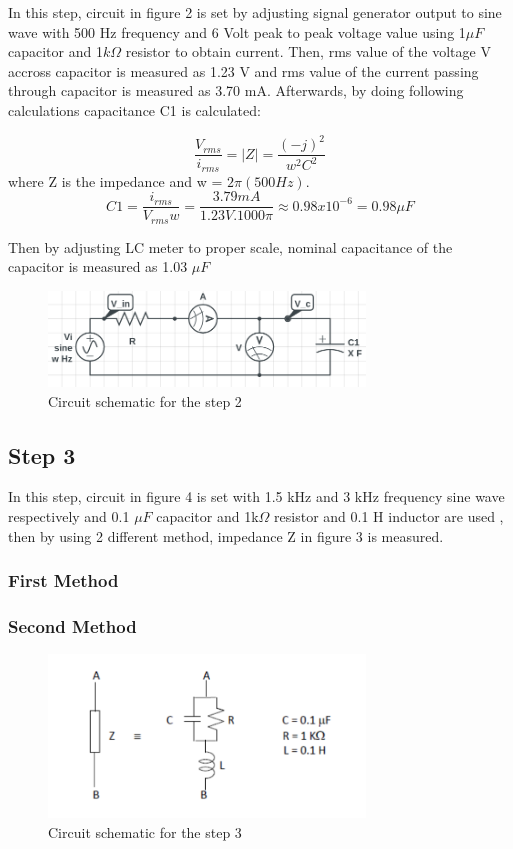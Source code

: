 \documentclass[letterpaper,12pt]{article}
\begin{document}
In this step, circuit in figure 2 is set by adjusting signal generator output to sine wave with 500 Hz frequency and 6 Volt peak to peak voltage value using 1\(\mu F\) capacitor and 1\(k\Omega \) resistor to obtain current. Then, rms value of the voltage V accross capacitor is measured as 1.23 V and rms value of the current passing through capacitor is measured as 3.70 mA. Afterwards, by doing following calculations capacitance C1 is calculated:

\[\frac{V_{rms}}{i_{rms}} = |Z| = \frac{(-j)^2}{w^2C^2}\]
where Z is the impedance and w = \(2\pi (500 Hz)\).  
\[C1 = \frac{i_{rms}}{V_{rms}w}  =  \frac{3.79 mA}{1.23 V . 1000\pi} \approx 0.98x10^{-6} = 0.98 \mu F\]

Then by adjusting LC meter to proper scale, nominal capacitance of the capacitor is measured as 1.03 \(\mu F\)
\begin{figure}[H]
    \centering
    \includegraphics[width = 0.75\textwidth]{2SCH.png}
    \caption{Circuit schematic for the step 2}
\end{figure} 
    
\subsection{Step 3}

In this step, circuit in figure 4 is set with 1.5 kHz and 3 kHz frequency sine wave respectively and 0.1 \(\mu F\) capacitor and 1k\(\Omega \) resistor and 0.1 H inductor are used , then by using 2 different method, impedance Z in figure 3 is measured. 

\subsubsection{First Method}


\subsubsection{Second Method}

\begin{figure}[H]
    \centering
    \includegraphics[width = 0.75\textwidth]{3SCH.png}
    \caption{Circuit schematic for the step 3}
\end{figure} 
\end{document}
